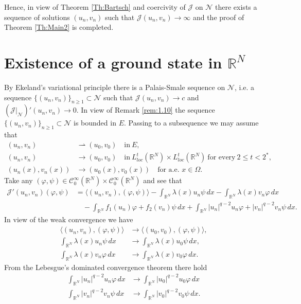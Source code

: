 \documentclass{scrartcl}
\newcommand{\cC}{{\mathcal C}}
\newcommand{\cJ}{{\mathcal J}}
\newcommand{\cN}{{\mathcal N}}
\newcommand{\R}{\mathbb{R}}
\newcommand{\weakto}{\rightharpoonup}
\numberwithin{equation}{section}
\begin{document}

Hence, in view of Theorem \ref{Th:Bartsch} and coercivity of $\cJ$ on $\cN$ there exists a sequence of solutions $(u_n, v_n)$ such that $\cJ(u_n,v_n) \to \infty$ and the proof of Theorem \ref{Th:Main2} is completed.

\section{Existence of a ground state in $\R^N$}\label{sect:5}

By Ekeland's variational principle there is a Palais-Smale sequence on $\cN$, i.e. a sequence $\{ (u_n, v_n) \}_{n \geq 1} \subset \cN$ such that $\cJ(u_n, v_n) \to c$ and $\left( \cJ \Big|_\cN \right)' (u_n, v_n) \to 0$. In view of Remark \ref{rem:1.10} the sequence $\{ (u_n, v_n) \}_{n \geq 1} \subset \cN$ is bounded in $E$. Passing to a subsequence we may assume that
\begin{align*}
(u_n, v_n) &\weakto (u_0, v_0) \quad \mbox{in} \ E, \\
(u_n, v_n) &\to (u_0, v_0) \quad \mbox{in} \ L^t_{loc} (\R^N) \times L^t_{loc} (\R^N) \ \mbox{for every} \ 2 \leq t < 2^*, \\
(u_n(x), v_n(x)) &\to (u_0(x), v_0(x)) \quad \mbox{for a.e. } x \in \Omega.
\end{align*}
Take any $(\varphi, \psi) \in \cC_0^\infty (\R^N) \times \cC_0^\infty (\R^N)$ and see that
\begin{align*}
\cJ' (u_n, v_n) ( \varphi, \psi) &= \langle (u_n, v_n), (\varphi, \psi) \rangle - \int_{\R^N} \lambda(x) u_n \psi \, dx - \int_{\R^N} \lambda(x) v_n \varphi \, dx \\ &\quad - \int_{\R^N} f_1 (u_n) \varphi + f_2 (v_n) \psi \, dx + \int_{\R^N} |u_n|^{q-2}u_n\varphi + |v_n|^{q-2}v_n\psi \, dx.
\end{align*}
In view of the weak convergence we have
\begin{align*}
\langle (u_n, v_n), (\varphi, \psi) \rangle &\to \langle (u_0, v_0), (\varphi, \psi) \rangle, \\
\int_{\R^N} \lambda(x) u_n \psi \, dx &\to \int_{\R^N} \lambda(x) u_0 \psi \, dx, \\
\int_{\R^N} \lambda(x) v_n \varphi \, dx &\to \int_{\R^N} \lambda(x) v_0 \varphi \, dx.
\end{align*}
From the Lebesgue's dominated convergence theorem there hold
\begin{align*}
\int_{\R^N} |u_n|^{q-2}u_n\varphi \, dx &\to \int_{\R^N} |u_0|^{q-2}u_0\varphi \, dx \\
\int_{\R^N} |v_n|^{q-2}v_n\psi \, dx &\to \int_{\R^N} |v_0|^{q-2}v_0\psi \, dx.
\end{align*}
\end{document}
